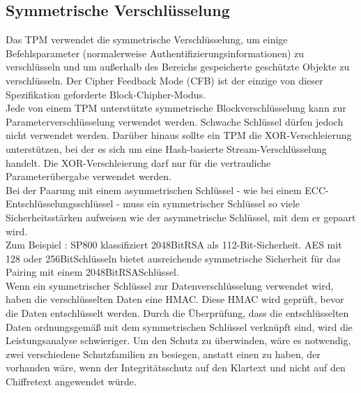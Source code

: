 \subsection{Symmetrische Verschlüsselung}
Das TPM verwendet die symmetrische Verschlüsselung, um einige Befehlsparameter (normalerweise Authentifizierungsinformationen) zu verschlüsseln und um außerhalb des Bereichs gespeicherte geschützte Objekte zu verschlüsseln. Der Cipher Feedback Mode (CFB) ist der einzige von dieser Spezifikation geforderte Block-Chipher-Modus.
\\
Jede von einem TPM unterstützte symmetrische Blockverschlüsselung kann zur Parameterverschlüsselung verwendet werden. Schwache Schlüssel dürfen jedoch nicht verwendet werden. Darüber hinaus sollte ein TPM die XOR-Verschleierung unterstützen, bei der es sich um eine Hash-basierte Stream-Verschlüsselung handelt. Die XOR-Verschleierung darf nur für die vertrauliche Parameterübergabe verwendet werden.
\\
Bei der Paarung mit einem asymmetrischen Schlüssel - wie bei einem ECC-Entschlüsselungsschlüssel - muss ein symmetrischer Schlüssel so viele Sicherheitsstärken aufweisen wie der asymmetrische Schlüssel, mit dem er gepaart wird.
\\
Zum Beispiel :
SP800 klassifiziert 2048\-Bit\-RSA als 112-Bit-Sicherheit. AES mit 128\- oder 256\-Bit\-Schlüsseln bietet ausreichende symmetrische Sicherheit für das Pairing mit einem 2048\-Bit\-RSA\-Schlüssel.
\\ Wenn ein symmetrischer Schlüssel zur Datenverschlüsselung verwendet wird, haben die verschlüsselten Daten eine HMAC. Diese HMAC wird geprüft, bevor die Daten entschlüsselt werden. Durch die Überprüfung, dass die entschlüsselten Daten ordnungsgemäß mit dem symmetrischen Schlüssel verknüpft sind, wird die Leistungsanalyse schwieriger. Um den Schutz zu überwinden, wäre es notwendig, zwei verschiedene Schutzfamilien zu besiegen, anstatt einen zu haben, der vorhanden wäre, wenn der Integritätsschutz auf den Klartext und nicht auf den Chiffretext angewendet würde.
\\
